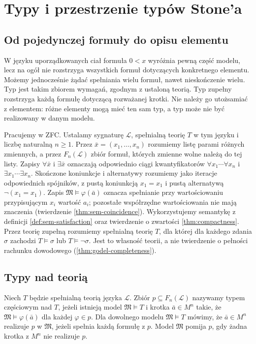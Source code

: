 \chapter{Typy i przestrzenie typów Stone'a}
\label{ch:mod-types}
\section{Od pojedynczej formuły do opisu elementu}
W języku uporządkowanych ciał formuła $0<x$ wyróżnia
pewną część modelu, lecz na ogół nie rozstrzyga wszystkich
formuł dotyczących konkretnego elementu. Możemy jednocześnie
żądać spełniania wielu formuł, nawet nieskończenie wielu. Typ
jest takim zbiorem wymagań, zgodnym z ustaloną teorią.
Typ zupełny rozstrzyga każdą formułę dotyczącą rozważanej krotki.
Nie należy go utożsamiać z elementem: różne elementy mogą
mieć ten sam typ, a typ może nie być realizowany w danym modelu.

Pracujemy w ZFC. Ustalamy sygnaturę $\mathcal L$, spełnialną teorię $T$
w tym języku i liczbę naturalną $n\geq1$. Przez $\bar x=(x_1,\ldots,x_n)$ rozumiemy
listę parami różnych zmiennych, a przez $F_n(\mathcal L)$ zbiór
formuł, których zmienne wolne należą do tej listy.
Zapisy $\forall\bar x$ i $\exists\bar x$ oznaczają odpowiednio
ciągi kwantyfikatorów $\forall x_1\cdots\forall x_n$ i
$\exists x_1\cdots\exists x_n$. Skończone koniunkcje i
alternatywy rozumiemy jako iteracje odpowiednich spójników,
z pustą koniunkcją $x_1=x_1$ i pustą alternatywą $\neg(x_1=x_1)$.
Zapis $\mathfrak M\models\varphi(\bar a)$ oznacza spełnianie
przy wartościowaniu przypisującym $x_i$ wartość $a_i$;
pozostałe współrzędne wartościowania nie mają znaczenia
(twierdzenie \ref{thm:sem-coincidence}).
Wykorzystujemy semantykę z definicji \ref{def:sem-satisfaction}
oraz twierdzenie o zwartości \ref{thm:compactness}.
Przez teorię zupełną rozumiemy spełnialną teorię $T$, dla
której dla każdego zdania $\sigma$ zachodzi $T\models\sigma$
lub $T\models\neg\sigma$. Jest to własność teorii, a nie
twierdzenie o pełności rachunku dowodowego
(\ref{thm:godel-completeness}).

\section{Typy nad teorią}
\begin{definicja}
\label{def:mod-partial-type}
Niech $T$ będzie spełnialną teorią języka $\mathcal L$.
Zbiór $p\subseteq F_n(\mathcal L)$ nazywamy typem częściowym
nad $T$, jeżeli istnieją model $\mathfrak M\models T$
i krotka $\bar a\in M^n$ takie, że
$\mathfrak M\models\varphi(\bar a)$ dla każdej $\varphi\in p$.
Dla dowolnego modelu $\mathfrak M\models T$ mówimy, że
$\bar a\in M^n$ realizuje $p$ w $\mathfrak M$, jeżeli spełnia
każdą formułę z $p$. Model $\mathfrak M$ pomija $p$, gdy żadna
krotka z $M^n$ nie realizuje $p$.
\end{definicja}

